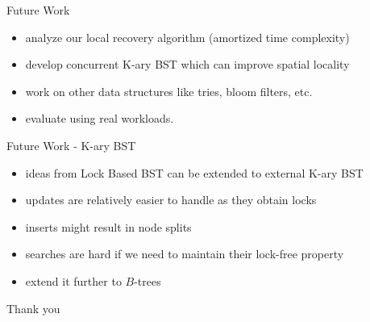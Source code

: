 \begin{frame}{Future Work}
\begin{itemize}
\item analyze our local recovery algorithm (amortized time complexity)
\item develop concurrent K-ary BST which can improve spatial locality
\item work on other data structures like tries, bloom filters, etc.
\item evaluate using real workloads.
\end{itemize}
\end{frame}

\ifdefined\LONG
\begin{frame}{Future Work - K-ary BST}
\begin{itemize}
\item ideas from Lock Based BST can be extended to external K-ary BST
\item updates are relatively easier to handle as they obtain locks
\item inserts might result in  node splits
\item searches are hard if we need to maintain their lock-free property
\item extend it further to $B$-trees
\end{itemize}
\end{frame}
\fi

\begin{comment}
\begin{frame}{Future Work - Local Recovery}
\begin{itemize}
\item currently upon failure, an operation restarts from the root
\item Ellen et.al[PODC'14] have shown that local recovery can be done for external BST
\item Local recovery on an internal BST is hard due to key movements
\item We are currently working on extending our algorithms to enable local recovery
\end{itemize}
\end{frame}

\begin{frame}{Future Work - other data structures}
\begin{itemize}
\item Tries are extensively used in text processing
\item Tree like structure. So our ideas $can$ $possibly$ be applied
\end{itemize}
\end{frame}
\end{comment}

\begin{frame}[c]
\centering
\Huge Thank you
\end{frame}
